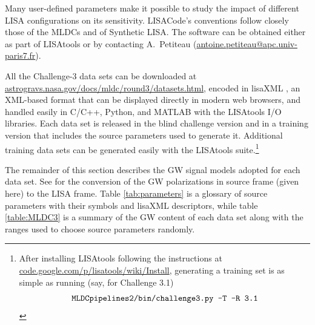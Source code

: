 \documentclass{iopart}
\begin{document}
Many user-defined parameters make it possible to study the impact of different LISA configurations on its sensitivity. 
LISACode's conventions follow closely those of the MLDCs and of Synthetic LISA. The software can be obtained either as part of LISAtools or by contacting A.\ Petiteau (\url{antoine.petiteau@apc.univ-paris7.fr}).

All the Challenge-3 data sets can be downloaded at \url{astrogravs.nasa.gov/docs/mldc/round3/datasets.html}, encoded in lisaXML \cite{mldclisasymp}, an XML-based format that can be displayed directly in modern web browsers, and handled easily in C/C++, Python, and MATLAB with the LISAtools I/O libraries. Each data set is released in the blind challenge version and in a training version that includes the source parameters used to generate it. Additional training data sets can be generated easily with the LISAtools suite.\footnote{After installing LISAtools following the instructions at \url{code.google.com/p/lisatools/wiki/Install}, generating a training set is as simple as running (say, for Challenge 3.1) 
\begin{displaymath}
\mbox{\texttt{MLDCpipelines2/bin/challenge3.py -T -R 3.1}}
\end{displaymath}}

The remainder of this section describes the GW signal models adopted for each data set. 
See \cite{mldcgwdaw2} for the conversion of the GW polarizations in source frame (given here) to the LISA frame. Table \ref{tab:parameters} is a glossary of source parameters with their symbols and lisaXML descriptors, while table \ref{table:MLDC3} is a summary of the GW content of each data set along with the ranges used to choose source parameters randomly.
\end{document}
